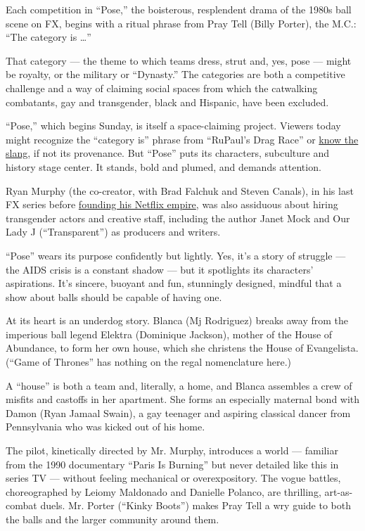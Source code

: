 Each competition in ``Pose,'' the boisterous, resplendent drama of the
1980s ball scene on FX, begins with a ritual phrase from Pray Tell
(Billy Porter), the M.C.: ``The category is \ldots{}''

That category --- the theme to which teams dress, strut and, yes, pose
--- might be royalty, or the military or ``Dynasty.'' The categories are
both a competitive challenge and a way of claiming social spaces from
which the catwalking combatants, gay and transgender, black and
Hispanic, have been excluded.

``Pose,'' which begins Sunday, is itself a space-claiming project.
Viewers today might recognize the ``category is'' phrase from ``RuPaul's
Drag Race'' or
\href{https://www.wired.com/story/rupauls-drag-race-slang/}{know the
slang}, if not its provenance. But ``Pose'' puts its characters,
subculture and history stage center. It stands, bold and plumed, and
demands attention.

Ryan Murphy (the co-creator, with Brad Falchuk and Steven Canals), in
his last FX series before
\href{https://www.nytimes3xbfgragh.onion/2018/02/13/business/media/netflix-ryan-murphy.html}{founding
his Netflix empire}, was also assiduous about hiring transgender actors
and creative staff, including the author Janet Mock and Our Lady J
(``Transparent'') as producers and writers.

``Pose'' wears its purpose confidently but lightly. Yes, it's a story of
struggle --- the AIDS crisis is a constant shadow --- but it spotlights
its characters' aspirations. It's sincere, buoyant and fun, stunningly
designed, mindful that a show about balls should be capable of having
one.

At its heart is an underdog story. Blanca (Mj Rodriguez) breaks away
from the imperious ball legend Elektra (Dominique Jackson), mother of
the House of Abundance, to form her own house, which she christens the
House of Evangelista. (``Game of Thrones'' has nothing on the regal
nomenclature here.)

A ``house'' is both a team and, literally, a home, and Blanca assembles
a crew of misfits and castoffs in her apartment. She forms an especially
maternal bond with Damon (Ryan Jamaal Swain), a gay teenager and
aspiring classical dancer from Pennsylvania who was kicked out of his
home.

The pilot, kinetically directed by Mr. Murphy, introduces a world ---
familiar from the 1990 documentary ``Paris Is Burning'' but never
detailed like this in series TV --- without feeling mechanical or
overexpository. The vogue battles, choreographed by Leiomy Maldonado and
Danielle Polanco, are thrilling, art-as-combat duels. Mr. Porter
(``Kinky Boots'') makes Pray Tell a wry guide to both the balls and the
larger community around them.

